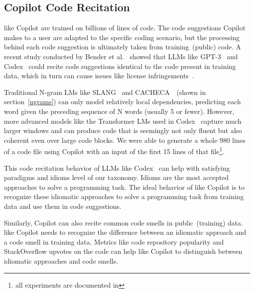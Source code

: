 \subsection{Copilot Code Recitation}
\label{recite}

\cct{} like Copilot are trained on billions of lines of code. The code suggestions Copilot makes to a user are adapted to the specific coding scenario, but the processing behind each code suggestion is ultimately taken from training~(public) code.
A recent study conducted by Bender et al.~\cite{stochastic_parrots} showed that LLMs like GPT-3~\cite{Gpt3} and Codex~\cite{copilot} could recite code suggestions identical to the code present in training data, which in turn can cause issues like license infringements~\cite{code_clone}.

Traditional N-gram LMs like SLANG~\cite{slang} and CACHECA~\cite{cacheca}~(shown in section~\ref{ngrams}) can only model relatively local dependencies, predicting each word given the preceding sequence of N words (usually 5 or fewer).
However, more advanced models like the Transformer LMs used in Codex~\cite{copilot} capture much larger windows and can produce code that is seemingly not only fluent but also coherent even over large code blocks. We were able to generate a whole 980 lines of a code file using Copilot with an input of the first 15 lines of that file\footnote{all experiments are documented in \repl{}}.  

This code recitation behavior of LLMs like Codex~\cite{copilot} can help with satisfying paradigms and idioms level of our taxonomy.
Idioms are the most accepted approaches to solve a programming task.
The ideal behavior of \cct{} like Copilot is to recognize these idiomatic approaches to solve a programming task from training data and use them in code suggestions.

Similarly, Copilot can also recite common code smells in public~(training) data. \cct{} like Copilot needs to recognize the difference between an idiomatic approach and a code smell in training data. 
Metrics like code repository popularity and StackOverflow upvotes on the code can help \cct{} like Copilot to distinguish between idiomatic approaches and code smells. 